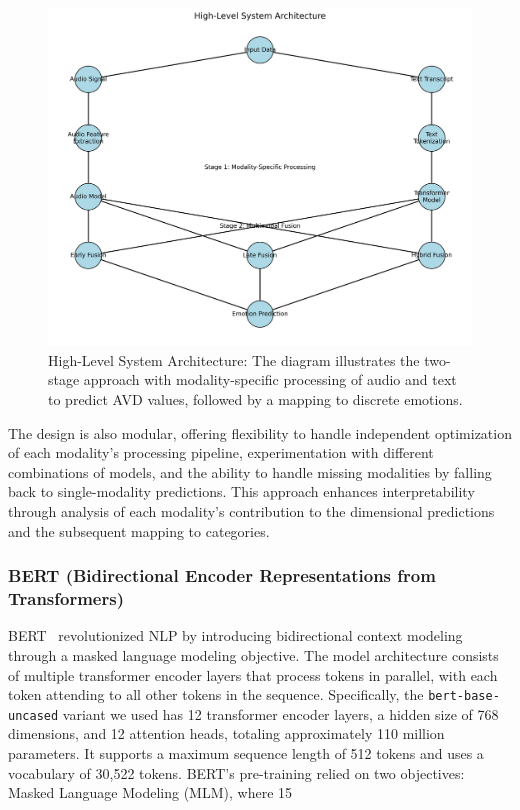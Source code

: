 \documentclass[12pt]{article}
\begin{document}
\begin{figure}[h]
    \centering
    \includegraphics[width=0.9\linewidth]{Figures/system_architecture_fixed.png}
    \caption{High-Level System Architecture: The diagram illustrates the two-stage approach with modality-specific processing of audio and text to predict AVD values, followed by a mapping to discrete emotions.}
    \label{fig:system_architecture}
\end{figure}

The design is also modular, offering flexibility to handle independent optimization of each modality's processing pipeline, experimentation with different combinations of models, and the ability to handle missing modalities by falling back to single-modality predictions. This approach enhances interpretability through analysis of each modality's contribution to the dimensional predictions and the subsequent mapping to categories.

\subsubsection{BERT (Bidirectional Encoder Representations from Transformers)}
BERT~\cite{devlin2018bert} revolutionized NLP by introducing bidirectional context modeling through a masked language modeling objective. The model architecture consists of multiple transformer encoder layers that process tokens in parallel, with each token attending to all other tokens in the sequence. Specifically, the \texttt{bert-base-uncased} variant we used has 12 transformer encoder layers, a hidden size of 768 dimensions, and 12 attention heads, totaling approximately 110 million parameters. It supports a maximum sequence length of 512 tokens and uses a vocabulary of 30,522 tokens. BERT's pre-training relied on two objectives: Masked Language Modeling (MLM), where 15%
\end{document}
